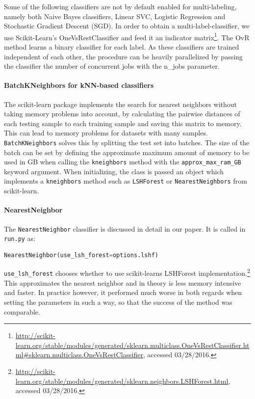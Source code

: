 \documentclass{article}
\begin{document}
Some of the following classifiers are not by default enabled for multi-labeling,
namely both Naive Bayes classifiers, Linear SVC, Logistic Regression and
Stochastic Gradient Descent (SGD). In order to obtain a multi-label-classifier, we use Scikit-Learn's OneVsRestClassifier
and feed it an indicator matrix\footnote{
\url{http://scikit-learn.org/stable/modules/generated/sklearn.multiclass.OneVsRestClassifier.html#sklearn.multiclass.OneVsRestClassifier}, accessed 03/28/2016.}.
The OvR method learns a binary classifier for each label. As these classifiers are trained independent of
each other, the procedure can be heavily parallelized by passing the classifier the number of concurrent
jobs with the n\_jobs parameter.
\paragraph{BatchKNeighbors for kNN-based classifiers}
The scikit-learn package implements the search for nearest neighbors without taking memory problems into account,
by calculating the pairwise distances of each testing sample to each training sample and saving this matrix to memory.
This can lead to memory problems for datasets with many samples.
\texttt{BatchKNeighbors} solves this by splitting the test set into batches.
The size of the batch can be set by defining the approximate maximum amount of memory to be used in GB when calling the
\texttt{kneighbors} method with the \texttt{approx\_max\_ram\_GB} keyword argument.
When initializing, the class is passed an object which implements a \texttt{kneighbors} method such as
\texttt{LSHForest} or \texttt{NearestNeighbors} from scikit-learn.
\paragraph{NearestNeighbor}
The \texttt{NearestNeighbor} classifier is discussed in detail in our paper.
It is called in \texttt{run.py} as:
\begin{lstlisting}[language=Python]
NearestNeighbor(use_lsh_forest=options.lshf)
\end{lstlisting}

\texttt{use\_lsh\_forest} chooses whether to use scikit-learns LSHForest implementation.\footnote{
  \url{http://scikit-learn.org/stable/modules/generated/sklearn.neighbors.LSHForest.html}, accessed 03/28/2016.
}
This approximates the nearest neighbor and in theory is less memory intensive and faster.
In practice however, it performed much worse in both regards when setting the parameters in such a way,
so that the success of the method was comparable.
\end{document}
